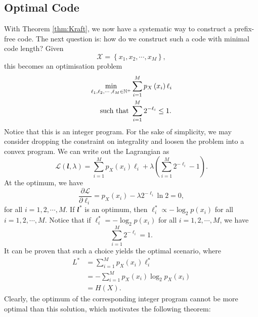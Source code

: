 \documentclass[math]{amznotes}
\theoremstyle{remark}
\begin{document}
\subsection{Optimal Code}
With Theorem \ref{thm:Kraft}, we now have a systematic way to construct a prefix-free code. The next question is: how do we construct such a code with minimal code length? Given 
\begin{equation*}
    \mathcal{X} = \left\{x_1, x_2, \cdots, x_M\right\},
\end{equation*}
this becomes an optimisation problem 
\begin{align*}
    \min_{\ell_1, \ell_2, \cdots, \ell_M \in \mathbb{N}^+}&\sum_{i = 1}^{M}p_X\left(x_i\right)\ell_i \\
    \textrm{such that }& \sum_{i = 1}^{M}2^{-\ell_i} \leq 1.
\end{align*}
Notice that this is an integer program. For the sake of simplicity, we may consider dropping the constraint on integrality and loosen the problem into a convex program. We can write out the Lagrangian as
\begin{equation*}
    \mathcal{L}\left(\mathbfit{l}, \lambda\right) = \sum_{i = 1}^{M}p_X\left(x_i\right)\ell_i + \lambda\left(\sum_{i = 1}^{M}2^{-\ell_i} - 1\right).
\end{equation*}
At the optimum, we have 
\begin{equation*}
    \frac{\partial \mathcal{L}}{\partial \ell_i} = p_X\left(x_i\right) - \lambda2^{-\ell_i}\ln 2 = 0,
\end{equation*}
for all $i = 1, 2, \cdots, M$. If $\mathbfit{l}^*$ is an optimum, then $\ell_i^* \propto -\log_2p\left(x_i\right)$ for all $i = 1, 2, \cdots, M$. Notice that if $\ell_i^* = -\log_2p\left(x_i\right)$ for all $i = 1, 2, \cdots, M$, we have 
\begin{equation*}
    \sum_{i = 1}^{M}2^{-\ell_i} = 1.
\end{equation*}
It can be proven that such a choice yields the optimal scenario, where 
\begin{align*}
    L^* & = \sum_{i = 1}^{M}p_X\left(x_i\right)\ell_i^* \\
    & = -\sum_{i = 1}^{M}p_X\left(x_i\right)\log_2p_X\left(x_i\right) \\
    & = H\left(X\right).
\end{align*}
Clearly, the optimum of the corresponding integer program cannot be more optimal than this solution, which motivates the following theorem:
\end{document}

